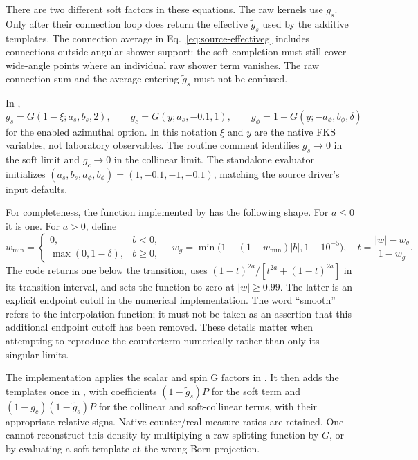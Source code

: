 There are two different soft factors in these equations. The raw kernels
use $g_s$. Only after their connection loop does
 return the effective
$\widetilde g_s$ used by the additive templates. The connection average in
Eq.~\eqref{eq:source-effectiveg} includes connections outside angular
shower support: the soft completion must still cover wide-angle points
where an individual raw shower term vanishes. The raw connection sum and
the average entering $\widetilde g_s$ must not be confused.

In ,
\begin{equation}
 g_s=G(1-\xi; a_s,b_s,2),\qquad
 g_c=G(y;a_s,-0.1,1),\qquad
 g_\phi=1-G(y;-a_\phi,b_\phi,\delta)
 \label{eq:source-garguments}
\end{equation}
for the enabled azimuthal option. In this notation $\xi$ and $y$ are the
native FKS variables, not laboratory observables. The routine comment
identifies $g_s\to0$ in the soft limit and $g_c\to0$ in the collinear limit.
The standalone evaluator initializes
$(a_s,b_s,a_\phi,b_\phi)=(1,-0.1,-1,-0.1)$, matching the source driver's
input defaults.

For completeness, the function implemented by
 has the following shape. For $a\leq0$ it is one.
For $a>0$, define
\begin{equation}
 w_{\min}=\begin{cases}0,&b<0,\\\max(0,1-\delta),&b\geq0,\end{cases}
 \quad w_g=\min\!\bigl(1-(1-w_{\min})|b|,1-10^{-5}\bigr),
 \quad t=\frac{|w|-w_g}{1-w_g}.
 \label{eq:source-gshape-vars}
\end{equation}
The code returns one below the transition, uses
$(1-t)^{2a}/[t^{2a}+(1-t)^{2a}]$ in its transition interval, and sets the
function to zero at $|w|\geq0.99$. The latter is an explicit endpoint
cutoff in the numerical implementation. The word ``smooth'' refers to the
interpolation function; it must not be taken as an assertion that this
additional endpoint cutoff has been removed. These details matter when
attempting to reproduce the counterterm numerically rather than only its
singular limits.

The implementation applies the scalar and spin G factors in
. It then adds the templates once in
, with coefficients
$(1-\widetilde g_s)P$ for the soft term and
$(1-g_c)(1-\widetilde g_s)P$ for the collinear and soft-collinear terms, with
their appropriate relative signs. Native counter/real measure ratios are
retained. One cannot reconstruct this density by multiplying a raw
splitting function by $G$, or by evaluating a soft template at the wrong
Born projection.

